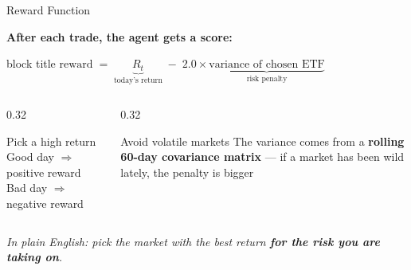 \documentclass[aspectratio=169,11pt]{beamer}
\begin{document}
\begin{frame}{Reward Function}
  \vspace{0.3em}
  \begin{center}
    \large\textbf{After each trade, the agent gets a score:}\\[1em]
    \begin{beamercolorbox}[wd=0.85\textwidth,center,sep=0.5em]{block title}
      \LARGE $\text{reward} \;=\; \underbrace{R_t}_{\text{today's return}} \;-\; 2.0 \times \underbrace{\text{variance of chosen ETF}}_{\text{risk penalty}}$
    \end{beamercolorbox}
  \end{center}
  \vspace{1em}
  \begin{columns}[T]
    \begin{column}{0.32\textwidth}
      \begin{block}{\centering Pick a high return}
        \centering\vspace{0.3em}
        \normalsize Good day $\Rightarrow$ positive reward\\[0.3em]
        Bad day $\Rightarrow$ negative reward
        \vspace{0.3em}
      \end{block}
    \end{column}
    \begin{column}{0.32\textwidth}
      \begin{block}{\centering Avoid volatile markets}
        \centering\vspace{0.3em}
        \normalsize The variance comes from a \textbf{rolling 60-day covariance matrix} --- if a market has been wild lately, the penalty is bigger
        \vspace{0.3em}
      \end{block}
    \end{column}
  \end{columns}
  \vspace{0.8em}
  \centering\small\textit{In plain English: pick the market with the best return \textbf{for the risk you are taking on}.}
\end{frame}

\end{document}
